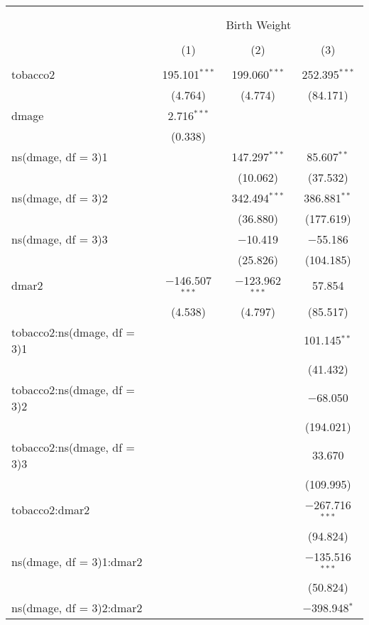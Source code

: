 \documentclass{article}
\begin{document}
\begin{table}[!htbp] \centering 
  \caption{} 
  \label{tab:splineresults} 
\begin{tabular}{@{\extracolsep{5pt}}lccc} 
\\[-1.8ex]\hline 
\hline \\[-1.8ex] 
\\[-1.8ex] & \multicolumn{3}{c}{Birth Weight} \\ 
\\[-1.8ex] & (1) & (2) & (3)\\ 
\hline \\[-1.8ex] 
 tobacco2 & 195.101$^{***}$ & 199.060$^{***}$ & 252.395$^{***}$ \\ 
  & (4.764) & (4.774) & (84.171) \\ 
  dmage & 2.716$^{***}$ &  &  \\ 
  & (0.338) &  &  \\ 
  ns(dmage, df = 3)1 &  & 147.297$^{***}$ & 85.607$^{**}$ \\ 
  &  & (10.062) & (37.532) \\ 
  ns(dmage, df = 3)2 &  & 342.494$^{***}$ & 386.881$^{**}$ \\ 
  &  & (36.880) & (177.619) \\ 
  ns(dmage, df = 3)3 &  & $-$10.419 & $-$55.186 \\ 
  &  & (25.826) & (104.185) \\ 
  dmar2 & $-$146.507$^{***}$ & $-$123.962$^{***}$ & 57.854 \\ 
  & (4.538) & (4.797) & (85.517) \\ 
  tobacco2:ns(dmage, df = 3)1 &  &  & 101.145$^{**}$ \\ 
  &  &  & (41.432) \\ 
  tobacco2:ns(dmage, df = 3)2 &  &  & $-$68.050 \\ 
  &  &  & (194.021) \\ 
  tobacco2:ns(dmage, df = 3)3 &  &  & 33.670 \\ 
  &  &  & (109.995) \\ 
  tobacco2:dmar2 &  &  & $-$267.716$^{***}$ \\ 
  &  &  & (94.824) \\ 
  ns(dmage, df = 3)1:dmar2 &  &  & $-$135.516$^{***}$ \\ 
  &  &  & (50.824) \\ 
  ns(dmage, df = 3)2:dmar2 &  &  & $-$398.948$^{*}$ \\ 

\end{tabular}
\end{table}
\end{document}
